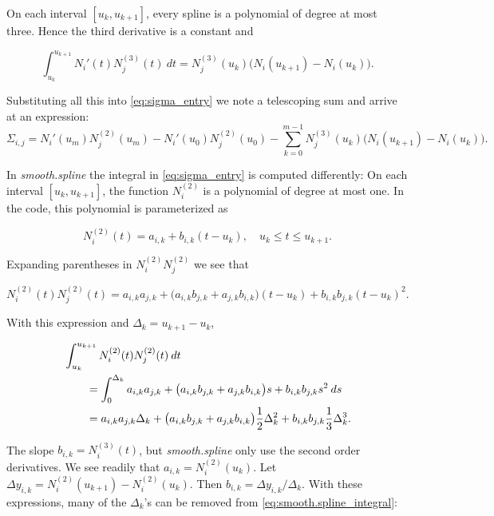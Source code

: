 \documentclass[a4paper]{scrartcl}
\newcommand\dd{\ensuremath{\:d}}
\begin{document}
On each interval $[u_k, u_{k+1}]$, every spline is a polynomial of degree at most three.
Hence the third derivative is a constant and

\begin{equation*}
    \int_{u_k}^{u_{k+1}} N_i'(t) N_j^{(3)}(t) \dd t
    = N_j^{(3)}(u_k) \bigl(N_i(u_{k+1}) - N_i(u_k)\bigr).
\end{equation*}

Substituting all this into \cref{eq:sigma_entry} we note a telescoping sum and arrive at an expression:
\begin{equation*}
    \Sigma_{i,j}
    = N_i'(u_m) N_j^{(2)}(u_m) - N_i'(u_0) N_j^{(2)}(u_0) 
    - \sum_{k = 0}^{m - 1} N_j^{(3)}(u_k) \bigl(N_i(u_{k+1}) - N_i(u_k)\bigr).
\end{equation*}

In \textit{smooth.spline} the integral in \cref{eq:sigma_entry} is computed differently:
On each interval $[u_k, u_{k+1}]$, the function $N_i^{(2)}$ is a polynomial of degree at most one.
In the code, this polynomial is parameterized as

\begin{equation*}
    N_i^{(2)}(t) 
    = a_{i,k} + b_{i,k} (t - u_k), 
    \quad u_k\leq t\leq u_{k+1}.
\end{equation*}

Expanding parentheses in $N_i^{(2)} N_j^{(2)}$ we see that

\begin{equation*}
    N_i^{(2)}(t) N_j^{(2)}(t)
    = a_{i,k} a_{j,k} + \bigl(a_{i,k} b_{j,k} + a_{j,k} b_{i,k}\bigr) (t - u_k) + b_{i,k} b_{j,k} (t - u_k)^2.
\end{equation*}

With this expression and $\Delta_k = u_{k+1} - u_k$,

\begin{align}
    \MoveEqLeft
    \int_{u_k}^{u_{k+1}} N_i^{(2)}(t) N_j^{(2)}(t) \dd t 
    \nonumber
    \\
    & = \int_0^{\Delta_k} a_{i,k} a_{j,k} + \bigl(a_{i,k} b_{j,k} + a_{j,k} b_{i,k}\bigr) s + b_{i,k} b_{j,k} s^2 \dd s 
    \nonumber
    \\
    & = a_{i,k} a_{j,k} \Delta_k + \bigl(a_{i,k} b_{j,k} + a_{j,k} b_{i,k}\bigr) \frac12 \Delta_k^2 + b_{i,k} b_{j,k} \frac13 \Delta_k^3.
    \label{eq:smooth.spline_integral}
\end{align}

The slope $b_{i,k} = N_i^{(3)}(t)$, but \textit{smooth.spline} only use the second order derivatives.
We see readily that $a_{i,k} = N_i^{(2)}(u_k)$.
Let $\Delta y_{i,k} = N_i^{(2)}(u_{k+1}) - N_i^{(2)}(u_k)$.
Then $b_{i,k} = \Delta y_{i,k} / \Delta_k$.
With these expressions, many of the $\Delta_k$'s can be removed from \cref{eq:smooth.spline_integral}:
\end{document}
